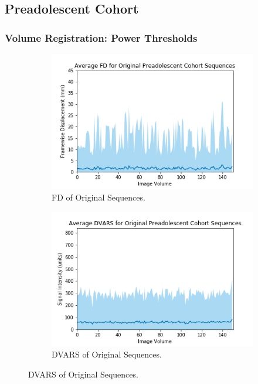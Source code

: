 \subsection{Preadolescent Cohort}

\subsubsection{Volume Registration: Power Thresholds}

\begin{figure}[]
	\centering
	\begin{subfigure}{0.4\textwidth}
		\centering
		\includegraphics[width=1.0\textwidth]{6/figures/preads-bold-fd-150.png}
		\caption{FD of Original Sequences.}
	\end{subfigure}
	\hspace{0.05\textwidth}
	\begin{subfigure}{0.4\textwidth}
		\centering
		\includegraphics[width=1.0\textwidth]{6/figures/preads-bold-dvars-150.png}
		\caption{DVARS of Original Sequences.}
	\end{subfigure}
	

\end{figure}
